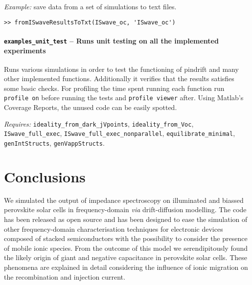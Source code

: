 
	\textit{Example:} save data from a set of simulations to text files.
	\begin{lstlisting}[style=Matlab-editor]
>> fromISwaveResultsToTxt(ISwave_oc, 'ISwave_oc')
\end{lstlisting}


		\paragraph{\texttt{examples\_unit\_test} -- Runs unit testing on all the implemented experiments}
Runs various simulations in order to test the functioning of pindrift and many other implemented functions.
Additionally it verifies that the results satisfies some basic checks.
For profiling the time spent running each function run \texttt{profile\- on} before running the tests and \texttt{profile\- viewer} after.
Using Matlab's Coverage Reports, the unused code can be easily spotted.

\textit{Requires:} \texttt{ideality\_from\_dark\_jVpoints}, \texttt{ideality\_from\_Voc}, \texttt{IS\-wave\_full\_exec}, \texttt{IS\-wave\_full\_exec\_nonparallel}, \texttt{equilibrate\_minimal}, \texttt{gen\-Int\-Structs}, \texttt{gen\-Vapp\-Structs}.


\section{Conclusions}
We simulated the output of impedance spectroscopy on illuminated and biassed perovskite solar cells in frequency\hyp{}domain \textsl{via} drift\hyp{}diffusion modelling.
The code has been released as open source and has been designed to ease the simulation of other frequency\hyp{}domain characterisation techniques for electronic devices composed of stacked semiconductors with the possibility to consider the presence of mobile ionic species.
From the outcome of this model we serendipitously found the likely origin of giant and negative capacitance in perovskite solar cells.
These phenomena are explained in detail considering the influence of ionic migration on the recombination and injection current.

